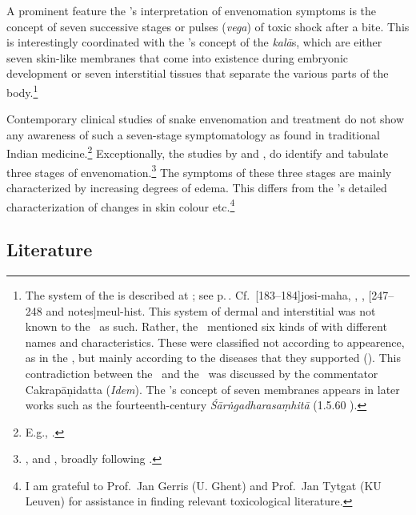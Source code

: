 A prominent feature the \SS's interpretation of envenomation symptoms
is the concept of seven successive stages or pulses
(\emph{vega}) of toxic shock after a bite. This is
interestingly coordinated with the \SS's concept of the 
\emph{kalā}s,
which are either seven skin-like membranes that come into
existence during embryonic development or seven interstitial tissues
that separate the various parts of the
body.\footnote{\label{ka4:kalā}The system of the  is
    described at ; see p.\,\pageref{sa4:kalā}.  Cf.\
    [183--184]{josi-maha}, \cite[227--228]{gupt-1983},
    \cite[6]{kutu-1962}, \volcite{1}[247--248 and notes]{meul-hist}. This
    system of dermal and interstitial \dev{kalā} was not known to the \CS\
    as such.  Rather, the \CS\ mentioned six kinds of
    \dev{tvac}\sse{tvac}{skin} with different names and characteristics. 
    These were classified not according to appearence, as in the \SS, but
    mainly according to the diseases that they supported
    (\Ca{4.7.4}{337}). This contradiction between the \CS\ and the \SS\
    was discussed by the commentator Cakrapāṇidatta (\emph{Idem}). The
    \SS's concept of seven membranes appears in later works such as the
    fourteenth-century \emph{Śārṅgadharasaṃhitā} (1.5.60
    \citep[40]{sast-1931}).}
    
    Contemporary clinical studies of snake envenomation and treatment do
    not show any awareness of such a seven-stage symptomatology as found
    in traditional Indian medicine.\footnote{E.g., \cites {elle-1997}
        {wein-2009} [1747--1749]{pill-2013} [19]{who-2019} {meht-2002}
        {hamz-2021} {desh-2022}.} Exceptionally, the studies by
        \citeauthor{barc-2008} and \citeauthor{oezb-2021}, do identify and
        tabulate three stages of envenomation.\footnote{\cite[1017, Table
            176.3]{barc-2008}, and \cite[7, and Table 1]{oezb-2021}, broadly
            following \citeauthor{barc-2008}.}  The symptoms of these three
            stages are mainly characterized by increasing degrees of edema.  This
            differs from the \SS's detailed characterization of changes in skin
            colour etc.\footnote{I am grateful to Prof.\ Jan Gerris (U. Ghent)
                and Prof.\ Jan Tytgat (KU Leuven) for assistance in finding relevant
                toxicological literature.}
                

\subsection{Literature} 

